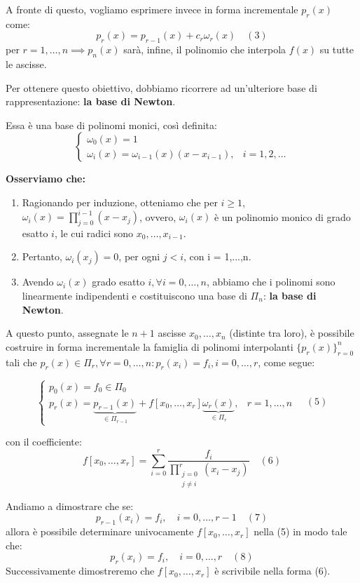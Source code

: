 A fronte di questo, vogliamo esprimere invece in forma incrementale $p_r(x)$ come:
$$p_r(x) = p_{r-1}(x) + c_r \omega_r(x) \quad (3)$$
per $r=1,\dots,n \implies p_n(x)$ sarà, infine, il polinomio che interpola $f(x)$ su tutte le ascisse.

Per ottenere questo obiettivo, dobbiamo ricorrere ad un'ulteriore base di rappresentazione: \textbf{la base di Newton}.

Essa è una base di polinomi monici, così definita:
$$\begin{cases}
\omega_0(x) = 1 \\
\omega_i(x) = \omega_{i-1}(x)(x-x_{i-1}), & i=1,2,\dots
\end{cases}$$

\textbf{Osserviamo che:}
\begin{enumerate}
    \item Ragionando per induzione, otteniamo che per $i \ge 1$, $\omega_i(x) = \prod_{j=0}^{i-1} (x-x_j)$, ovvero, $\omega_i(x)$ è un polinomio monico di grado esatto $i$, le cui radici sono $x_0, \dots, x_{i-1}$.
    \item Pertanto, $\omega_i(x_j) = 0$, per ogni $j < i$, con i = 1,...,n.
    \item Avendo $\omega_i(x)$ grado esatto $i, \forall i=0,\dots,n$, abbiamo che i polinomi sono linearmente indipendenti e costituiscono una base di $\Pi_n$: \textbf{la base di Newton}.
\end{enumerate}

A questo punto, assegnate le $n+1$ ascisse $x_0, \dots, x_n$ (distinte tra loro), è possibile costruire in forma incrementale la famiglia di polinomi interpolanti $\{p_r(x)\}_{r=0}^n$ tali che $p_r(x) \in \Pi_r, \forall r=0,\dots,n : p_r(x_i) = f_i, i=0,\dots,r$, come segue:

$$\begin{cases}
p_0(x) = f_0 \in \Pi_0 \\
p_r(x) = \underbrace{p_{r-1}(x)}_{\in \Pi_{r-1}} + f[x_0, \dots, x_r] \underbrace{\omega_r(x)}_{\in \Pi_r}, & r=1,\dots,n
\end{cases} \quad (5)$$

con il coefficiente:
$$f[x_0, \dots, x_r] = \sum_{i=0}^{r} \frac{f_i}{\prod_{\substack{j=0 \\ j \neq i}}^{r} (x_i-x_j)} \quad (6)$$

Andiamo a dimostrare che se:
$$p_{r-1}(x_i) = f_i, \quad i=0,\dots,r-1 \quad (7)$$
allora è possibile determinare univocamente $f[x_0, \dots, x_r]$ nella (5) in modo tale che:
$$p_r(x_i) = f_i, \quad i=0,\dots,r \quad (8)$$
Successivamente dimostreremo che $f[x_0, \dots, x_r]$ è scrivibile nella forma (6).

